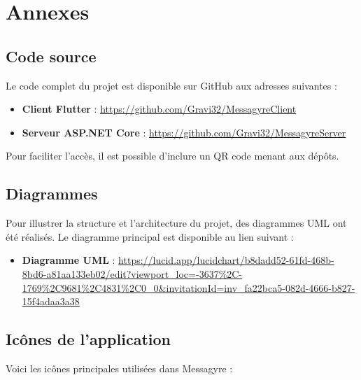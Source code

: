 \documentclass[12pt]{report}
\begin{document}
\chapter{Annexes}

\section{Code source}

Le code complet du projet est disponible sur GitHub aux adresses suivantes :

\begin{itemize}
	\item \textbf{Client Flutter} : \url{https://github.com/Gravi32/MessagyreClient}
	\item \textbf{Serveur ASP.NET Core} : \url{https://github.com/Gravi32/MessagyreServer}
\end{itemize}

Pour faciliter l’accès, il est possible d’inclure un QR code menant aux dépôts.

\section{Diagrammes}

Pour illustrer la structure et l’architecture du projet, des diagrammes UML ont été réalisés. Le diagramme principal est disponible au lien suivant :

\begin{itemize}
	\item \textbf{Diagramme UML} : \url{https://lucid.app/lucidchart/b8dadd52-61fd-468b-8bd6-a81aa133eb02/edit?viewport_loc=-3637\%2C-1769\%2C9681\%2C4831\%2C0_0&invitationId=inv_fa22bca5-082d-4666-b827-15f4adaa3a38}
\end{itemize}

\section{Icônes de l’application}

Voici les icônes principales utilisées dans Messagyre :
\end{document}
